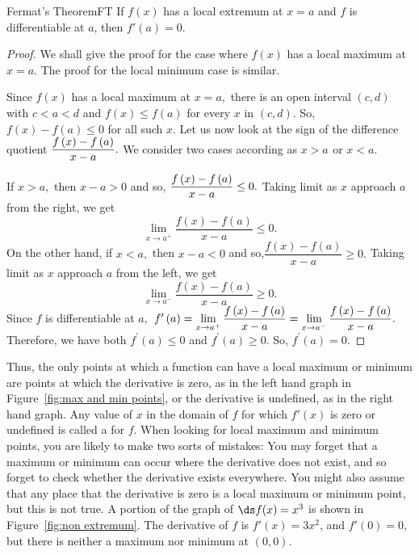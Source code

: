 \begin{theorem}{Fermat's Theorem}{FT} 
	If $f(x)$ has a local extremum at $x=a$ and $f$ is differentiable at $a$, then $f'(a)=0$.
\end{theorem}
\begin{proof}
	We shall give the proof for the case where $f\left( x\right) $ has a
	local maximum at $x=a.$ The proof for the local minimum case is similar.
	
	Since $f\left( x\right) $ has a local maximum at $x=a,$ there is an open
	interval $\left( c,d\right) $ with $c<a<d$ and $f\left( x\right) \leq
	f\left( a\right) $ for every $x$ in $\left( c,d\right) .$ So, $f\left(
	x\right) -f\left( a\right) \leq 0$ for all such $x.$ Let us now look at the
	sign of the difference quotient $\dfrac{f\left( x\right) -f\left( a\right) }{%
		x-a}.$ We consider two cases according as $x>a\,\ $or $x<a.$
	
	If $x>a,$ then $x-a>0$ and so, $\dfrac{f\left( x\right) -f\left( a\right) }{%
		x-a}\leq 0.$ Taking limit as $x$ approach $a$ from the right, we get%
	\begin{equation*}
		\lim_{x\rightarrow a^{+}}\frac{f\left( x\right) -f\left( a\right) }{x-a}\leq
		0.
	\end{equation*}
	On the other hand, if $x<a,$ then $x-a<0$ and so,$\dfrac{f\left( x\right)
		-f\left( a\right) }{x-a}\geq 0.$ Taking limit as $x$ approach $a$ from the
	left, we get%
	\begin{equation*}
		\lim_{x\rightarrow a^{-}}\frac{f\left( x\right) -f\left( a\right) }{x-a}\geq
		0.
	\end{equation*}
	Since $f$ is differentiable at $a,$ $f^{\prime }\left( a\right)
	=\lim\limits_{x\rightarrow a^{+}}\dfrac{f\left( x\right) -f\left( a\right) }{%
		x-a}=\lim\limits_{x\rightarrow a^{-}}\dfrac{f\left( x\right) -f\left(
		a\right) }{x-a}.$ Therefore, we have both $f^{\prime }\left( a\right) \leq 0$
	and $f^{\prime }\left( a\right) \geq 0.$ So, $f^{\prime }\left( a\right) =0.$
\end{proof}

Thus, the only points at which a function can have a local maximum or minimum are
points at which the derivative is zero, as in the left hand graph in
Figure~\ref{fig:max and min points},
or the derivative is undefined, as in the right hand graph. Any value
of $x$ in the domain of $f$ for which $f'(x)$ is zero or undefined is called a
 for $f$. When looking for local maximum 
and minimum points, you are likely to
make two sorts of mistakes: You may forget that a maximum or minimum
can occur where the derivative does not exist, and so forget to check
whether the derivative exists everywhere. You might also assume that
any place that the derivative is zero is a local maximum or minimum
point, but this is not true. A portion of the graph of $\ds f(x)=x^3$ is
shown in Figure~\ref{fig:non extremum}. The derivative of $f$ is
$f'(x)=3x^2$, and $f'(0)=0$, but there is neither a maximum nor
minimum at $(0,0)$.

